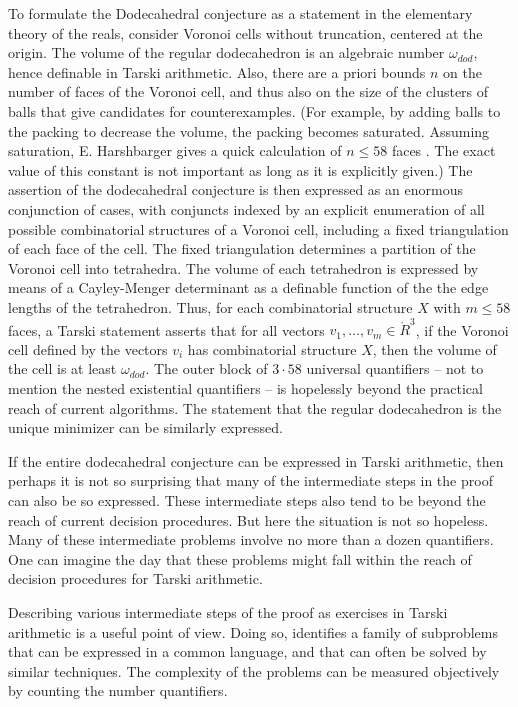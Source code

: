 \documentclass{article} %
\begin{document}
To formulate the Dodecahedral conjecture as a statement in the
elementary theory of the reals, consider Voronoi cells without
truncation, centered at the origin.  The
volume of the regular dodecahedron is an algebraic number $\omega_{dod}$,
hence definable in Tarski arithmetic.  Also, there are
a priori bounds $n$ on the number of faces of the Voronoi cell, and thus also
on the size of the clusters of balls that give candidates for counterexamples. (For example, by adding balls to the packing to decrease the volume, 
the  packing becomes saturated.  Assuming saturation, E. Harshbarger gives a quick calculation of $n\le58$ faces \cite{Har}. The exact value of this constant is not important as long as it is explicitly given.)
The assertion of the dodecahedral conjecture is then expressed as an enormous conjunction
of cases, with conjuncts indexed by an explicit enumeration of all possible combinatorial structures of a Voronoi cell, including a fixed triangulation of each face of the cell.  The fixed triangulation determines
a partition of the Voronoi cell into tetrahedra.  The volume of each tetrahedron is expressed by means of a Cayley-Menger determinant as a definable function of the the edge lengths of the tetrahedron.  Thus, for each combinatorial structure $X$ with $m\le 58$ faces, a Tarski statement asserts that
for all vectors $v_1,\ldots,v_m\in\ring{R}^3$, if the Voronoi cell defined by the vectors $v_i$ has combinatorial structure $X$, then the volume of the cell is at least $\omega_{dod}$.  The outer block of $3\cdot 58$ universal quantifiers -- not to mention the nested existential quantifiers -- is hopelessly beyond the practical reach of current algorithms.  The statement that the regular dodecahedron is the unique minimizer can be similarly expressed.

If the entire dodecahedral conjecture can be expressed
in Tarski arithmetic, then perhaps it is not so surprising that
many of the intermediate steps in the proof can also be so expressed.
These intermediate steps also tend to be beyond the reach of
current decision procedures.  
But here the situation is not so hopeless.  Many of these
intermediate problems involve no more than a dozen quantifiers.
One can imagine the day that these problems might fall within the
reach of decision procedures for Tarski arithmetic.

Describing various intermediate steps 
of the proof as exercises
in Tarski arithmetic is a useful point of view.  Doing so, identifies
a family of subproblems that can be expressed in a common language,
and that can often be solved by similar techniques.  
The complexity of the
problems can be measured objectively by counting the number
quantifiers.
\end{document}
